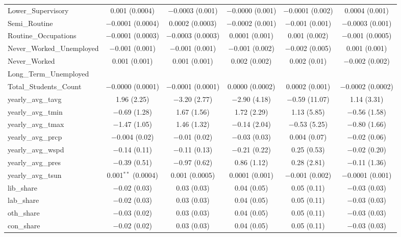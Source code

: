 \documentclass[12pt,letterpaper]{article}
\begin{document}
\begin{table}[!htbp]
\begin{adjustbox}{width=\textwidth}
\begin{tabular}{@{\extracolsep{5pt}}lccccc}
			Lower\_Supervisory & 0.001 (0.0004) & $-$0.0003 (0.001) & $-$0.0000 (0.001) & $-$0.0001 (0.002) & 0.0004 (0.001) \\ 
			Semi\_Routine & $-$0.0001 (0.0004) & 0.0002 (0.0003) & $-$0.0002 (0.001) & $-$0.001 (0.001) & $-$0.0003 (0.001) \\ 
			Routine\_Occupations & $-$0.0001 (0.0003) & $-$0.0003 (0.0003) & 0.0001 (0.001) & 0.001 (0.002) & $-$0.001 (0.0005) \\ 
			Never\_Worked\_Unemployed & $-$0.001 (0.001) & $-$0.001 (0.001) & $-$0.001 (0.002) & $-$0.002 (0.005) & 0.001 (0.001) \\ 
			Never\_Worked & 0.001 (0.001) & 0.001 (0.001) & 0.002 (0.002) & 0.002 (0.01) & $-$0.002 (0.002) \\ 
			Long\_Term\_Unemployed &  &  &  &  &  \\ 
			Total\_Students\_Count & $-$0.0000 (0.0001) & $-$0.0001 (0.0001) & 0.0000 (0.0002) & 0.0002 (0.001) & $-$0.0002 (0.0002) \\ 
			yearly\_avg\_tavg & 1.96 (2.25) & $-$3.20 (2.77) & $-$2.90 (4.18) & $-$0.59 (11.07) & 1.14 (3.31) \\ 
			yearly\_avg\_tmin & $-$0.69 (1.28) & 1.67 (1.56) & 1.72 (2.29) & 1.13 (5.85) & $-$0.56 (1.58) \\ 
			yearly\_avg\_tmax & $-$1.47 (1.05) & 1.46 (1.32) & $-$0.14 (2.04) & $-$0.53 (5.25) & $-$0.80 (1.66) \\ 
			yearly\_avg\_prcp & $-$0.004 (0.02) & $-$0.01 (0.02) & $-$0.03 (0.03) & 0.004 (0.07) & $-$0.02 (0.06) \\ 
			yearly\_avg\_wspd & $-$0.14 (0.11) & $-$0.11 (0.13) & $-$0.21 (0.22) & 0.25 (0.53) & $-$0.02 (0.20) \\ 
			yearly\_avg\_pres & $-$0.39 (0.51) & $-$0.97 (0.62) & 0.86 (1.12) & 0.28 (2.81) & $-$0.11 (1.36) \\ 
			yearly\_avg\_tsun & 0.001$^{**}$ (0.0004) & 0.001 (0.0005) & 0.0001 (0.001) & $-$0.001 (0.002) & $-$0.0001 (0.001) \\ 
			lib\_share & $-$0.02 (0.03) & 0.03 (0.03) & 0.04 (0.05) & 0.05 (0.11) & $-$0.03 (0.03) \\ 
			lab\_share & $-$0.02 (0.03) & 0.03 (0.03) & 0.04 (0.05) & 0.05 (0.11) & $-$0.03 (0.03) \\ 
			oth\_share & $-$0.03 (0.02) & 0.03 (0.03) & 0.04 (0.05) & 0.05 (0.11) & $-$0.03 (0.03) \\ 
			con\_share & $-$0.02 (0.02) & 0.03 (0.03) & 0.04 (0.05) & 0.05 (0.11) & $-$0.03 (0.03) \\ 

\end{tabular}
\end{adjustbox}
\end{table}
\end{document}
